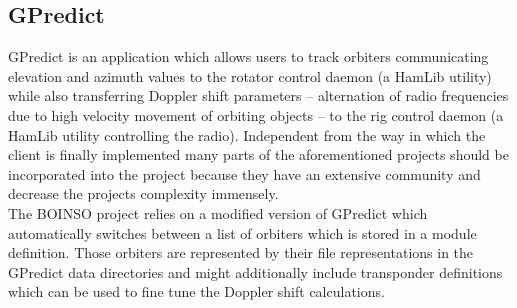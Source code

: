 \documentclass[BachelorPaper]{subfiles}
\begin{document}
\subsection{GPredict}
\label{subsec:mat_gpredict}
GPredict is an application which allows users to track orbiters communicating elevation and azimuth values to the rotator control daemon (a \ac{HamLib} utility) while also transferring Doppler shift parameters -- alternation of radio frequencies due to high velocity movement of orbiting objects -- to the rig control daemon (a \ac{HamLib} utility controlling the radio). Independent from the way in which the client is finally implemented many parts of the aforementioned projects should be incorporated into the project because they have an extensive community and decrease the projects complexity immensely.\\

The BOINSO project relies on a modified version of GPredict which automatically switches between a list of orbiters which is stored in a module definition. Those orbiters are represented by their file representations in the GPredict data directories and might additionally include transponder definitions which can be used to fine tune the Doppler shift calculations.
\end{document}
